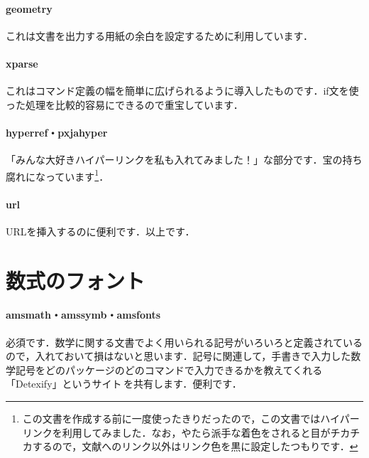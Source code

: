 \documentclass[uplatex]{jsreport}
\begin{document}
\paragraph{geometry} これは文書を出力する用紙の余白を設定するために利用しています\cite{geometry}．
\paragraph{xparse} これはコマンド定義の幅を簡単に広げられるように導入したものです．if文を使った処理を比較的容易にできるので重宝しています\cite{xparse}．
\paragraph{hyperref・pxjahyper} 「みんな大好きハイパーリンクを私も入れてみました！」な部分です．宝の持ち腐れになっています\cite{hyperref, pxjahyper}\footnote{この文書を作成する前に一度使ったきりだったので，この文書ではハイパーリンクを利用してみました．なお，やたら派手な着色をされると目がチカチカするので，文献へのリンク以外はリンク色を黒に設定したつもりです．}．
\paragraph{url} URLを挿入するのに便利です．以上です\cite{url}．

\section{数式のフォント}
\paragraph{amsmath・amssymb・amsfonts} 必須です．数学に関する文書でよく用いられる記号がいろいろと定義されているので，入れておいて損はないと思います\cite{amsmath,amsfonts}．記号に関連して，手書きで入力した数学記号をどのパッケージのどのコマンドで入力できるかを教えてくれる「Detexify」というサイト\cite{Detexify}\,を共有します．便利です．
\end{document}
